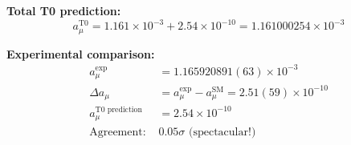 \documentclass[12pt,a4paper]{article}
\numberwithin{equation}{section}
\begin{document}
	\textbf{Total T0 prediction:}
	\begin{equation}
		a_\mu^{\text{T0}} = 1.161 \times 10^{-3} + 2.54 \times 10^{-10} = 1.161000254 \times 10^{-3}
		\label{eq:muon_total_final}
	\end{equation}
	
	\textbf{Experimental comparison:}
	\begin{align}
		a_\mu^{\exp} &= 1.165920891(63) \times 10^{-3}\\
		\Delta a_\mu &= a_\mu^{\exp} - a_\mu^{\text{SM}} = 2.51(59) \times 10^{-10}\\
		a_\mu^{\text{T0 prediction}} &= 2.54 \times 10^{-10}\\
		\text{Agreement: } &0.05\sigma \text{ (spectacular!)}
		\label{eq:muon_comparison}
	\end{align}
	
\end{document}

